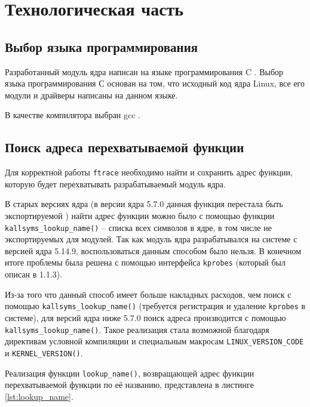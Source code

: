 \chapter{Технологическая часть}

\section{Выбор языка программирования}

Разработанный модуль ядра написан на языке программирования C \cite{c-language}. Выбор языка программирования С основан на том, что исходный код ядра Linux, все его модули и драйверы написаны на данном языке.

В качестве компилятора выбран gcc \cite{gcc}.

\section{Поиск адреса перехватываемой функции}

Для корректной работы \texttt{ftrace} необходимо найти и сохранить адрес функции, которую будет перехватывать разрабатываемый модуль ядра. 

В старых версиях ядра (в версии ядра 5.7.0 данная функция перестала быть экспортируемой \cite{kallsyms-removed}) найти адрес функции можно было с помощью функции \texttt{kallsyms\_lookup\_name()} -- списка всех символов в ядре, в том числе не экспортируемых для модулей. Так как модуль ядра разрабатывался на системе с версией ядра 5.14.9, воспользоваться данным способом было нельзя. В конечном итоге проблемы была решена с помощью интерфейса \texttt{kprobes} (который был описан в 1.1.3).

Из-за того что данный способ имеет больше накладных расходов, чем поиск с помощью \texttt{kallsyms\_lookup\_name()} (требуется регистрация и удаление \texttt{kprobes} в системе), для версий ядра ниже 5.7.0 поиск адреса производится с помощью \texttt{kallsyms\_lookup\_name()}. Такое реализация стала возможной благодаря директивам условной компиляции \cite{preproc} и специальным макросам 
\texttt{LINUX\_VERSION\_CODE} и \texttt{KERNEL\_VERSION()}. 

Реализация функции \texttt{lookup\_name()}, возвращающей адрес функции перехватываемой функции по её названию, представлена в листинге \ref{lst:lookup_name}.\\

